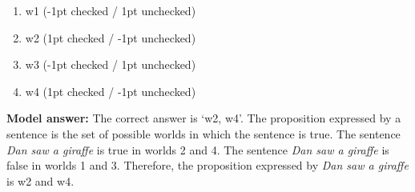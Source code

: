 \documentclass[a4,11pt]{article}
\begin{document}
\begin{enumerate}[leftmargin = 12pt]
\begin{multicols}{2}
\end{multicols}
   
       \begin{enumerate}[noitemsep]
         \item w1 (-1pt checked / 1pt unchecked)
        \item w2 (1pt checked / -1pt unchecked)
       \item w3 (-1pt checked / 1pt unchecked)
       \item  w4 (1pt checked / -1pt unchecked)
        \end{enumerate}
   
 {\bf Model answer:} The correct answer is `w2, w4'. The proposition expressed by a sentence is the set of possible worlds in which the sentence is true. The sentence \textit{Dan saw a giraffe} is true in worlds 2 and 4. The sentence \textit{Dan saw a giraffe} is false in worlds 1 and 3. Therefore, the proposition expressed by  \textit{Dan saw a giraffe} is w2 and w4.
              
       \end{enumerate}

        
\end{document}
